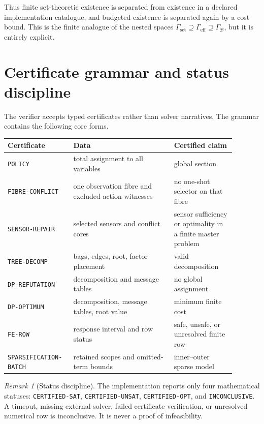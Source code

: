 \documentclass[11pt]{article}
\theoremstyle{plain}
\theoremstyle{definition}
\theoremstyle{remark}
\newtheorem{remark}[theorem]{Remark}
\newcommand{\GammaSet}{\Gamma_{\mathrm{set}}}
\newcommand{\GammaEff}{\Gamma_{\mathrm{eff}}}
\newcommand{\GammaB}{\Gamma_{\mathcal B}}
\begin{document}
Thus finite set-theoretic existence is separated from existence in a declared
implementation catalogue, and budgeted existence is separated again by a cost
bound.  This is the finite analogue of the nested spaces
\(\GammaSet\supseteq\GammaEff\supseteq\GammaB\), but it is entirely explicit.

\section{Certificate grammar and status discipline}
\label{sec:certificates}

The verifier accepts typed certificates rather than solver narratives.  The
grammar contains the following core forms.

\begin{center}
\begin{tabular}{@{}p{0.23\linewidth}p{0.41\linewidth}p{0.25\linewidth}@{}}
\toprule
Certificate & Data & Certified claim\\
\midrule
\texttt{POLICY} & total assignment to all variables & global section\\
\texttt{FIBRE-CONFLICT} & one observation fibre and excluded-action witnesses & no one-shot selector on that fibre\\
\texttt{SENSOR-REPAIR} & selected sensors and conflict cores & sensor sufficiency or optimality in a finite master problem\\
\texttt{TREE-DECOMP} & bags, edges, root, factor placement & valid decomposition\\
\texttt{DP-REFUTATION} & decomposition and message tables & no global assignment\\
\texttt{DP-OPTIMUM} & decomposition, message tables, root value & minimum finite cost\\
\texttt{FE-ROW} & response interval and row status & safe, unsafe, or unresolved finite row\\
\texttt{SPARSIFICATION-BATCH} & retained scopes and omitted-term bounds & inner--outer sparse model\\
\bottomrule
\end{tabular}
\end{center}

\begin{remark}[Status discipline]
The implementation reports only four mathematical statuses:
\texttt{CERTIFIED-SAT}, \texttt{CERTIFIED-UNSAT}, \texttt{CERTIFIED-OPT}, and
\texttt{INCONCLUSIVE}.  A timeout, missing external solver, failed certificate
verification, or unresolved numerical row is inconclusive.  It is never a proof
of infeasibility.
\end{remark}
\end{document}

